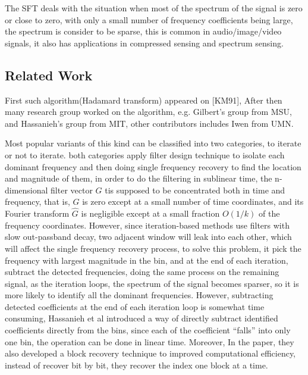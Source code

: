 \documentclass[journal,transmag]{IEEEtran}
\begin{document}
The SFT deals with the situation when most of the spectrum of the signal is zero or close to zero, with only a small number of frequency coefficients being large, the spectrum is consider to be sparse, this is common in audio/image/video signals\cite{chandrakasan1996data}, it also has applications in compressed sensing\cite{donoho2006compressed,candes2006robust} and spectrum sensing\cite{lin2011new}. 



\subsection{Related Work}
First such algorithm(Hadamard transform) appeared on [KM91], After then many research group worked on the algorithm, e.g. Gilbert’s group from MSU\cite{gilbert2005improved,gilbert2008tutorial}, and Hassanieh’s group from MIT, other contributors includes Iwen from UMN\cite{iwen2010combinatorial}.

Most popular variants of this kind can be classified into two categories, to iterate\cite{gilbert2005improved} or not to iterate\cite{hassanieh2012simple}. both categories apply filter design technique to isolate each dominant frequency and then doing single frequency recovery to find the location and magnitude of them, in order to do the filtering in sublinear time, the n-dimensional filter vector $G$ tis supposed to be concentrated both in time and frequency, that is, $G$ is zero except at a small number of time coordinates, and its Fourier transform $\hat{G}$ is negligible except at a small fraction $O(1/k)$ of the frequency coordinates. However, since iteration-based methods use filters with slow out-passband decay, two adjacent window will leak into each other, which will affect the single frequency recovery process, to solve this problem, it pick the frequency with largest magnitude in the bin, and at the end of each iteration, subtract the detected frequencies, doing the same process on the remaining signal, as the iteration loops, the spectrum of the signal becomes sparser, so it is more likely to identify all the dominant frequencies. However, subtracting detected coefficients at the end of each iteration loop is somewhat time consuming, Hassanieh et al introduced a way\cite{hassanieh2012nearly} of directly subtract identified coefficients directly from the bins,  since each of the coefficient “falls” into only one bin, the operation can be done in linear time. Moreover, In the paper, they also developed a block recovery technique to improved computational efficiency, instead of recover bit by bit, they recover the index one block at a time. 
\end{document}
